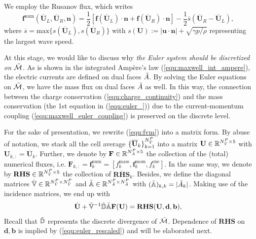 \documentclass{article}
\begin{document}
We employ the Rusanov flux, which writes
\begin{equation} \label{equ:rusanov-flux-3d}
    \mathbf{f}^\text{num}\left(\overline{\mathbf{U}}_L, \overline{\mathbf{U}}_R, \mathbf{n}\right) = \frac{1}{2}\left[\mathbf{f}(\overline{\mathbf{U}}_L)\cdot\mathbf{n} + \mathbf{f}(\overline{\mathbf{U}}_R)\cdot\mathbf{n}\right] - \frac{1}{2}\overline{s}\left(\overline{\mathbf{U}}_R - \overline{\mathbf{U}}_L\right),  
\end{equation}
where $\overline{s} = \text{max}\{s(\overline{\mathbf{U}}_L), s(\overline{\mathbf{U}}_R)\}$ with $s(\mathbf{U}) := |\mathbf{u}\cdot\mathbf{n}| + \sqrt{\gamma p/\rho}$ representing the largest wave speed. 

At this stage, we would like to discuss why \emph{the Euler system should be discretized
  on $\Tilde{\mathcal{M}}$}. As is shown in the integrated Amp\`{e}re's law
(\ref{equ:maxwell_int_ampere}), the electric currents are defined on dual faces
$\Tilde{A}$. By solving the Euler equations on $\Tilde{\mathcal{M}}$, we have the mass
flux on dual faces $\Tilde{A}$ as well. In this way, the connection between the charge
conservation (\ref{equ:charge_continuity}) and the mass conservation (the 1st equation in
(\ref{equ:euler_})) due to the current-momentum coupling
(\ref{equ:maxwell_euler_coupling}) is preserved on the discrete level.

For the sake of presentation, we rewrite (\ref{equ:fvm}) into a matrix form. By abuse of
notation, we stack all the cell average
$\{\overline{\mathbf{U}}_k\}_{k=1}^{N^P_{\Tilde{V}}}$ into a matrix
$\mathbf{U} \in \mathbb{R}^{N_{\Tilde{V}}^P \times 5}$ with
$\mathbf{U}_{k,:} = \overline{\mathbf{U}}_k$. Further, we denote by
$\mathbf{F} \in \mathbb{R}^{N_{\Tilde{A}}^P \times 5}$ the collection of the (total)
numerical fluxes, i.e.
$\mathbf{F}_{k,:} = \mathbf{f}^\text{num}_k = [f^\text{mass}_k, \bm{f}^\text{mom}_k,
f^\text{ene}_k]$. In the same way, we denote by
$\mathbf{RHS}\in \mathbb{R}^{N_{\Tilde{V}}^P \times 5}$ the collection of
$\overline{\mathbf{RHS}}_k$. Besides, we define the diagonal matrices
$\mathbb{\Tilde{V}} \in \mathbb{R}^{N_{\Tilde{V}}^P \times N_{\Tilde{V}}^P}$ and
$\mathbb{\Tilde{A}}\in \mathbb{R}^{N_{\Tilde{A}}^P \times N_{\Tilde{A}}^P}$ with
$(\mathbb{\Tilde{A}})_{k,k} = |\Tilde{A}_k|$. Making use of the incidence matrices, we end
up with
\begin{equation} \label{equ:euler_matrix_form}
    \dot{\mathbf{U}} + \mathbb{\Tilde{V}}^{-1}\mathbb{\Tilde{D}}\mathbb{\Tilde{A}}\mathbf{F}(\mathbf{U})  = \mathbf{RHS}(\mathbf{U},\mathbf{d},\mathbf{b}),
\end{equation}
Recall that $\Tilde{\mathbb{D}}$ represents the discrete divergence of
$\Tilde{\mathcal{M}}$. Dependence of $\mathbf{RHS}$ on $\mathbf{d}, \mathbf{b}$ is implied
by (\ref{equ:euler_rescaled}) and will be elaborated next.
\end{document}
